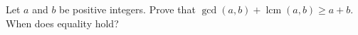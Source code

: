 Let $a$ and $b$ be positive integers. Prove that $\gcd(a,b)+\operatorname{lcm}(a,b)\ge a+b$. When does equality hold?
